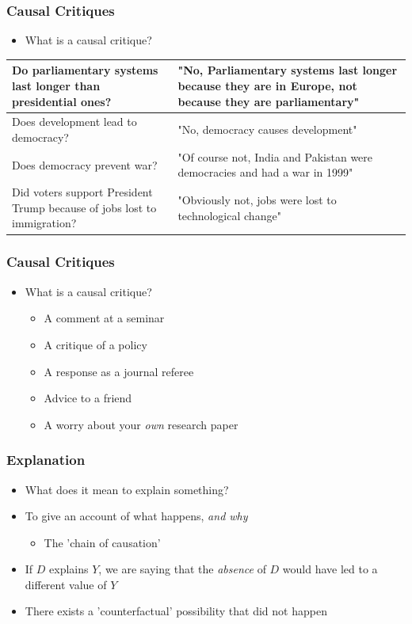 \documentclass[xcolor=x11names,compress]{beamer}\usepackage[]{graphicx}\usepackage[]{color}
\renewcommand{\(}{\begin{columns}}
\renewcommand{\)}{\end{columns}}
\newcommand{\<}[1]{\begin{column}{#1}}
\renewcommand{\>}{\end{column}}
\begin{document}
\begin{frame}
\frametitle{Causal Critiques}
\begin{itemize}
\item What is a causal critique?
\pause
\end{itemize}
\begin{table}[htbp]
  \centering
    \begin{tabular}{|>{\raggedright}p{5cm}|p{5cm}|}
    \hline
    Do parliamentary systems last longer than presidential ones? & "No, Parliamentary systems last longer because they are in Europe, not because they are parliamentary" \pause \\
    \hline
    Does development lead to democracy? & "No, democracy causes development" \pause \\
    \hline
    Does democracy prevent war? & "Of course not, India and Pakistan were democracies and had a war in 1999" \pause \\
    \hline
    Did voters support President Trump because of jobs lost to immigration? & "Obviously not, jobs were lost to technological change" \\
    \hline
    \end{tabular}%
  \label{tab:addlabel}%
\end{table}%
\end{frame}

\begin{frame}
\frametitle{Causal Critiques}
\begin{itemize}
\item What is a causal critique?
\begin{itemize}
\item A comment at a seminar
\pause
\item A critique of a policy
\pause
\item A response as a journal referee
\pause
\item Advice to a friend
\pause
\item A worry about your \textit{own} research paper
\end{itemize}
\end{itemize}
\end{frame}

\begin{frame}
\frametitle{Explanation}
\begin{itemize}
\item What does it mean to explain something?
\pause
\item To give an account of what happens, \textit{and why}
\begin{itemize}
\item The 'chain of causation'
\pause
\end{itemize}
\item If $D$ explains $Y$, we are saying that the \textit{absence} of $D$ would have led to a different value of $Y$
\pause
\item There exists a 'counterfactual' possibility that did not happen
\end{itemize}
\end{frame}
\end{document}
